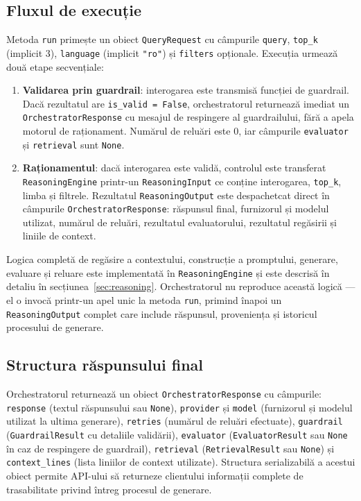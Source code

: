 \documentclass[12pt, a4paper, oneside, romanian]{teza-upb}
\begin{document}
\subsection{Fluxul de execuție}

Metoda \texttt{run} primește un obiect \texttt{QueryRequest} cu câmpurile \texttt{query}, \texttt{top\_k} (implicit 3), \texttt{language} (implicit \texttt{"ro"}) și \texttt{filters} opționale. Execuția urmează două etape secvențiale:

\begin{enumerate}
    \item \textbf{Validarea prin guardrail}: interogarea este transmisă funcției de guardrail. Dacă rezultatul are \texttt{is\_valid = False}, orchestratorul returnează imediat un \texttt{OrchestratorResponse} cu mesajul de respingere al guardrailului, fără a apela motorul de raționament. Numărul de reluări este 0, iar câmpurile \texttt{evaluator} și \texttt{retrieval} sunt \texttt{None}.
    \item \textbf{Raționamentul}: dacă interogarea este validă, controlul este transferat \texttt{ReasoningEngine} printr-un \texttt{ReasoningInput} ce conține interogarea, \texttt{top\_k}, limba și filtrele. Rezultatul \texttt{ReasoningOutput} este despachetcat direct în câmpurile \texttt{OrchestratorResponse}: răspunsul final, furnizorul și modelul utilizat, numărul de reluări, rezultatul evaluatorului, rezultatul regăsirii și liniile de context.
\end{enumerate}

Logica completă de regăsire a contextului, construcție a promptului, generare, evaluare și reluare este implementată în \texttt{ReasoningEngine} și este descrisă în detaliu în secțiunea~\ref{sec:reasoning}. Orchestratorul nu reproduce această logică — el o invocă printr-un apel unic la metoda \texttt{run}, primind înapoi un \texttt{ReasoningOutput} complet care include răspunsul, proveniența și istoricul procesului de generare.

\subsection{Structura răspunsului final}

Orchestratorul returnează un obiect \texttt{OrchestratorResponse} cu câmpurile: \texttt{response} (textul răspunsului sau \texttt{None}), \texttt{provider} și \texttt{model} (furnizorul și modelul utilizat la ultima generare), \texttt{retries} (numărul de reluări efectuate), \texttt{guardrail} (\texttt{GuardrailResult} cu detaliile validării), \texttt{evaluator} (\texttt{EvaluatorResult} sau \texttt{None} în caz de respingere de guardrail), \texttt{retrieval} (\texttt{RetrievalResult} sau \texttt{None}) și \texttt{context\_lines} (lista liniilor de context utilizate). Structura serializabilă a acestui obiect permite API-ului să returneze clientului informații complete de trasabilitate privind întreg procesul de generare.
\end{document}
